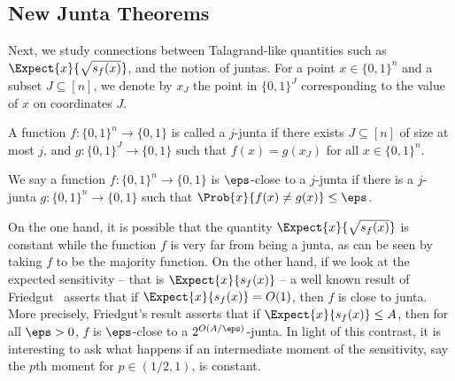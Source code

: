 \subsection{New Junta Theorems}
Next, we study connections between Talagrand-like quantities such as $\Expect{x}{\sqrt{s_f(x)}}$, and the notion of juntas.
For a point $x\in \{0,1\}^n$ and a subset $J\subseteq [n]$, we denote by $x_J$ the point in $\{0,1\}^J$ corresponding to
the value of $x$ on coordinates $J$.
\begin{definition}
  A function $f\colon\{0,1\}^n\to\{0,1\}$ is called a $j$-junta if there exists $J\subseteq [n]$ of size at most $j$,
  and $g\colon \{0,1\}^J\to\{0,1\}$ such that $f(x) = g(x_J)$ for all $x\in\{0,1\}^n$.

  We say a function $f\colon\{0,1\}^n\to\{0,1\}$ is $\eps$-close to a $j$-junta if there is a $j$-junta $g\colon\{0,1\}^n\to\{0,1\}$
  such that $\Prob{x}{f(x)\neq g(x)}\leq \eps$.
\end{definition}
On the one hand, it is possible that the quantity $\Expect{x}{\sqrt{s_f(x)}}$ is constant while the function $f$ is very far from being a junta,
as can be seen by taking $f$ to be the majority function. On the other hand, if we look at the expected sensitivity -- that is
$\Expect{x}{s_f(x)}$ -- a well known result of Friedgut~\cite{Friedgut} asserts that if $\Expect{x}{s_f(x)} = O(1)$, then $f$
is close to junta. More precisely, Friedgut's result asserts that if $\Expect{x}{s_f(x)} \leq A$, then
for all $\eps>0$, $f$ is $\eps$-close to a $2^{O(A/\eps)}$-junta. In light of this contrast, it is interesting to ask
what happens if an intermediate moment of the sensitivity, say the $p$th moment for $p\in (1/2,1)$, is constant.

